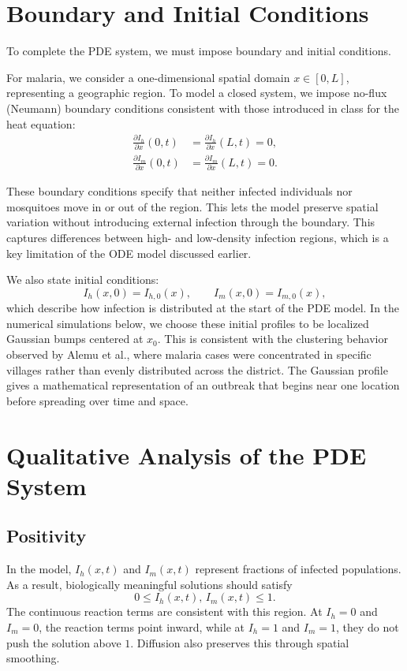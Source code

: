\documentclass[12pt]{article}
\begin{document}
\section{Boundary and Initial Conditions}

To complete the PDE system, we must impose boundary and initial conditions.

For malaria, we consider a one-dimensional spatial domain $x \in [0, L]$, representing a geographic region. To model a closed system, we impose no-flux (Neumann) boundary conditions consistent with those introduced in class for the heat equation\cite{Sandstede2026}:
\begin{align}
\frac{\partial I_h}{\partial x}(0,t) &= \frac{\partial I_h}{\partial x}(L,t) = 0, \\
\frac{\partial I_m}{\partial x}(0,t) &= \frac{\partial I_m}{\partial x}(L,t) = 0.
\end{align}

These boundary conditions specify that neither infected individuals nor mosquitoes move in or out of the region. This lets the model preserve spatial variation without introducing external infection through the boundary. This captures differences between high- and low-density infection regions, which is a key limitation of the ODE model discussed earlier. 

We also state initial conditions:
\[
I_h(x,0)=I_{h,0}(x), \qquad I_m(x,0)=I_{m,0}(x),
\]
which describe how infection is distributed at the start of the PDE model. In the numerical simulations below, we choose these initial profiles to be localized Gaussian bumps centered at \(x_0\). This is consistent with the clustering behavior observed by Alemu et al., where malaria cases were concentrated in specific villages rather than evenly distributed across the district. The Gaussian profile gives a mathematical representation of an outbreak that begins near one location before spreading over time and space.

\section{Qualitative Analysis of the PDE System}

\subsection{Positivity}

In the model, \(I_h(x,t)\) and \(I_m(x,t)\) represent fractions of infected populations. As a result, biologically meaningful solutions should satisfy
\[
0 \leq I_h(x,t),\, I_m(x,t) \leq 1.
\]
The continuous reaction terms are consistent with this  region. At \(I_h=0\) and \(I_m=0\), the reaction terms point inward, while at \(I_h=1\) and \(I_m=1\), they do not push the solution above \(1\). Diffusion also preserves this through spatial smoothing. 
\end{document}
